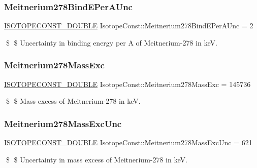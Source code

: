 \subsubsection{\texorpdfstring{Meitnerium278\+Bind\+E\+Per\+A\+Unc}{Meitnerium278BindEPerAUnc}}
{\footnotesize\ttfamily \mbox{\hyperlink{group___isotope_const-_macros_ga8f45a7272ce02c0b4c65c44636ed719a}{I\+S\+O\+T\+O\+P\+E\+C\+O\+N\+S\+T\+\_\+\+D\+O\+U\+B\+LE}} Isotope\+Const\+::\+Meitnerium278\+Bind\+E\+Per\+A\+Unc = 2}

\$ \$ Uncertainty in binding energy per A of Meitnerium-\/278 in keV. \mbox{\label{group___isotope_const-_meitnerium-_mt278_gabe6e28af72edc602a445f216c1bf8fee}} 
\subsubsection{\texorpdfstring{Meitnerium278\+Mass\+Exc}{Meitnerium278MassExc}}
{\footnotesize\ttfamily \mbox{\hyperlink{group___isotope_const-_macros_ga8f45a7272ce02c0b4c65c44636ed719a}{I\+S\+O\+T\+O\+P\+E\+C\+O\+N\+S\+T\+\_\+\+D\+O\+U\+B\+LE}} Isotope\+Const\+::\+Meitnerium278\+Mass\+Exc = 145736}

\$ \$ Mass excess of Meitnerium-\/278 in keV. \mbox{\label{group___isotope_const-_meitnerium-_mt278_ga22f2cddc0255cb0e1d0ef49fae5306ea}} 
\subsubsection{\texorpdfstring{Meitnerium278\+Mass\+Exc\+Unc}{Meitnerium278MassExcUnc}}
{\footnotesize\ttfamily \mbox{\hyperlink{group___isotope_const-_macros_ga8f45a7272ce02c0b4c65c44636ed719a}{I\+S\+O\+T\+O\+P\+E\+C\+O\+N\+S\+T\+\_\+\+D\+O\+U\+B\+LE}} Isotope\+Const\+::\+Meitnerium278\+Mass\+Exc\+Unc = 621}

\$ \$ Uncertainty in mass excess of Meitnerium-\/278 in keV. \mbox{\label{group___isotope_const-_meitnerium-_mt278_gac936e0a593ee166b5cae1bddac62ed61}} 
